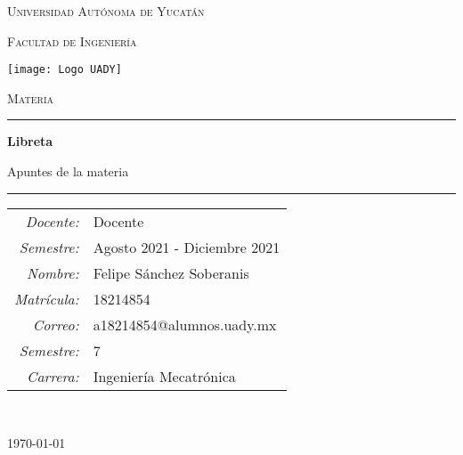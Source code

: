 \documentclass[Libreta.tex]{subfiles}
\begin{document}
\thispagestyle{empty}
\setcounter{page}{0}

{
    \centering
    \setlength{\parindent}{0pt}

    {\LARGE\textsc{Universidad Autónoma de Yucatán}\\}

    {\large\textsc{Facultad de Ingeniería}\\}

    \vspace{2em}

    \texttt{[image: Logo UADY]}

    \vspace{1em}

    {\Large\textsc{Materia}\\}

    \vspace{1em}

    \rule{\textwidth}{1pt}

    {\LARGE\textbf{Libreta}\\}

    {\large Apuntes de la materia\\}

    \rule{\textwidth}{1pt}

    \vspace{3em}

    {
        \raggedright
        \begin{tabular}{r l}
            \textit{Docente:} & Docente \\

            \textit{Semestre:} & Agosto 2021 - Diciembre 2021 \\

            \textit{Nombre:} & Felipe Sánchez Soberanis \\

            \textit{Matrícula:} & 18214854 \\

            \textit{Correo:} & a18214854@alumnos.uady.mx \\

            \textit{Semestre:} & 7 \\

            \textit{Carrera:} & Ingeniería Mecatrónica
        \end{tabular}
    \\}

    \vfill

    {
        \raggedleft
        \today
    \\}
}
\end{document}
